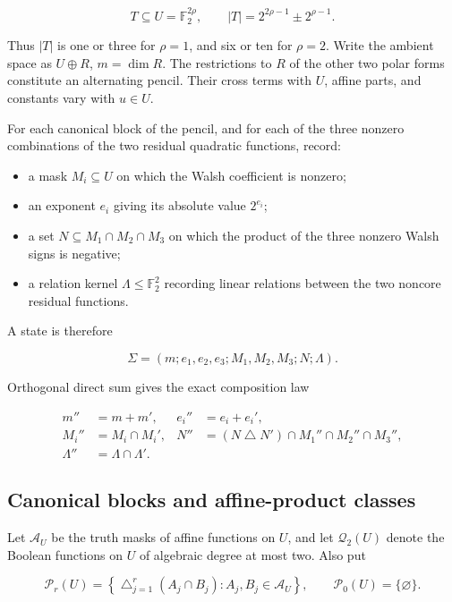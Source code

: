 \documentclass[11pt]{article}
\theoremstyle{remark}
\numberwithin{equation}{section}
\begin{document}
\[
T\subseteq U=\mathbb F_2^{2\rho},
\qquad
|T|=2^{2\rho-1}\pm2^{\rho-1}.                  \tag{6.1}
\]

Thus \(|T|\) is one or three for \(\rho=1\), and six or ten for \(\rho=2\).
Write the ambient space as \(U\oplus R\), \(m=\dim R\). The restrictions to
\(R\) of the other two polar forms constitute an alternating pencil. Their
cross terms with \(U\), affine parts, and constants vary with \(u\in U\).

For each canonical block of the pencil, and for each of the three nonzero
combinations of the two residual quadratic functions, record:

\begin{itemize}
\item a mask \(M_i\subseteq U\) on which the Walsh coefficient is nonzero;
\item an exponent \(e_i\) giving its absolute value \(2^{e_i}\);
\item a set \(N\subseteq M_1\cap M_2\cap M_3\) on which the product of the three
nonzero Walsh signs is negative;
\item a relation kernel \(\Lambda\le\mathbb F_2^2\) recording linear relations
between the two noncore residual functions.
\end{itemize}


A state is therefore

\[
\Sigma=(m;e_1,e_2,e_3;M_1,M_2,M_3;N;\Lambda).  \tag{6.2}
\]

Orthogonal direct sum gives the exact composition law

\[
\begin{aligned}
m''&=m+m',& e_i''&=e_i+e_i',\\
M_i''&=M_i\cap M_i',&
N''&=(N\mathbin\triangle N')\cap M_1''\cap M_2''\cap M_3'',\\
\Lambda''&=\Lambda\cap\Lambda'.
\end{aligned}                                                     \tag{6.3}
\]

\subsection{Canonical blocks and affine-product classes}


Let \(\mathcal A_U\) be the truth masks of affine functions on \(U\), and let
\(\mathcal Q_2(U)\) denote the Boolean functions on \(U\) of algebraic degree
at most two. Also put

\[
\mathcal P_r(U)=
\left\{\mathop{\triangle}_{j=1}^r(A_j\cap B_j):
A_j,B_j\in\mathcal A_U\right\},
\qquad \mathcal P_0(U)=\{\varnothing\}.         \tag{6.4}
\]
\end{document}
